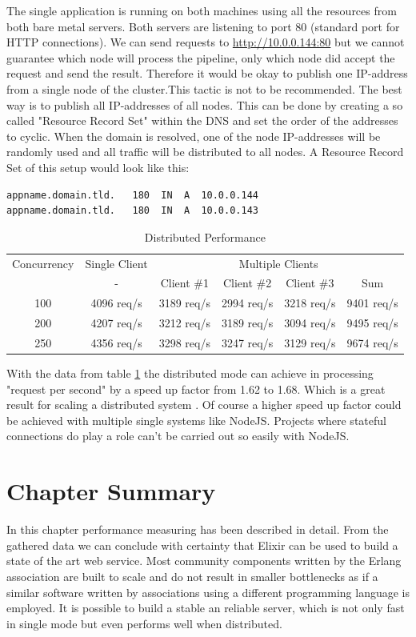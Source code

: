 {The single application is running on both machines using all the resources from both bare metal servers. Both servers are listening to port 80 (standard port for HTTP connections). We can send requests to \url{http://10.0.0.144:80} but we cannot guarantee which node will process the pipeline, only which node did accept the request and send the result. Therefore it would be okay to publish one IP-address from a single node of the cluster.This tactic is not to be recommended.
The best way is to publish all IP-addresses of all nodes. This can be done by creating a so called "Resource Record Set" within the DNS and set the order of the addresses to cyclic. When the domain is resolved, one of the node IP-addresses will be randomly used and all traffic will be distributed to all nodes. A Resource Record Set of this setup would look like this:
\begin{lstlisting}[caption={Resource Record Set},label=lst:nodecondig]
appname.domain.tld.   180  IN  A  10.0.0.144
appname.domain.tld.   180  IN  A  10.0.0.143
\end{lstlisting}

\begin{table}
 \caption{Distributed Performance}
 \label{table_dP}
\begin{tabular}{c||c|cccc}

Concurrency & Single Client  & \multicolumn{4}{c}{Multiple Clients} \\ 
 & - & Client \#1 & Client \#2  & Client \#3 & Sum  \\ 
\hline 
100 & 4096 req/s &  3189 req/s & 2994  req/s & 3218  req/s & 9401 req/s \\ 
\hline 
200 & 4207 req/s & 3212 req/s & 3189  req/s &  3094 req/s & 9495 req/s \\ 
\hline 
250 & 4356 req/s & 3298 req/s & 3247  req/s & 3129  req/s & 9674 req/s \\ 
 
\end{tabular} 
\end{table}
}

{\color{newcode}
With the data from table \ref{table_dP} the distributed mode can achieve in processing "request per second" by a speed up factor from 1.62 to 1.68. Which is a great result for scaling a distributed system \cite{9783642108761}. Of course a higher speed up factor could be achieved with multiple single systems like NodeJS. Projects where stateful connections do play a role can't be carried out so easily with NodeJS. \cite{StatelessvsStatefulWebApps}

\section{Chapter Summary}
In this chapter performance measuring has been described in detail. From the gathered data we can conclude with certainty that Elixir can be used to build a state of the art web service. Most community components written by the Erlang association are built to scale and do not result in smaller bottlenecks as if a similar software written by associations using a different programming language is employed.
It is possible to build a stable an reliable server, which is not only fast in single mode but even performs well when distributed. 
}
